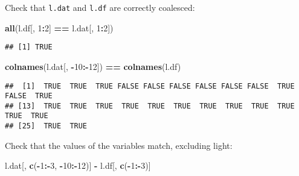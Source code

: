 \documentclass[]{article}
\newenvironment{Shaded}{\begin{snugshade}}{\end{snugshade}}
\newcommand{\KeywordTok}[1]{\textcolor[rgb]{0.13,0.29,0.53}{\textbf{#1}}}
\newcommand{\DecValTok}[1]{\textcolor[rgb]{0.00,0.00,0.81}{#1}}
\newcommand{\StringTok}[1]{\textcolor[rgb]{0.31,0.60,0.02}{#1}}
\newcommand{\OperatorTok}[1]{\textcolor[rgb]{0.81,0.36,0.00}{\textbf{#1}}}
\newcommand{\NormalTok}[1]{#1}
\begin{document}
Check that \texttt{l.dat} and \texttt{l.df} are correctly coalesced:

\begin{Shaded}
\begin{Highlighting}[]
\KeywordTok{all}\NormalTok{(l.df[, }\DecValTok{1}\OperatorTok{:}\DecValTok{2}\NormalTok{] }\OperatorTok{==}\StringTok{ }\NormalTok{l.dat[, }\DecValTok{1}\OperatorTok{:}\DecValTok{2}\NormalTok{])}
\end{Highlighting}
\end{Shaded}

\begin{verbatim}
## [1] TRUE
\end{verbatim}

\begin{Shaded}
\begin{Highlighting}[]
\KeywordTok{colnames}\NormalTok{(l.dat[, }\OperatorTok{-}\DecValTok{10}\OperatorTok{:-}\DecValTok{12}\NormalTok{]) }\OperatorTok{==}\StringTok{ }\KeywordTok{colnames}\NormalTok{(l.df)}
\end{Highlighting}
\end{Shaded}

\begin{verbatim}
##  [1]  TRUE  TRUE  TRUE FALSE FALSE FALSE FALSE FALSE FALSE  TRUE FALSE  TRUE
## [13]  TRUE  TRUE  TRUE  TRUE  TRUE  TRUE  TRUE  TRUE  TRUE  TRUE  TRUE  TRUE
## [25]  TRUE  TRUE
\end{verbatim}

Check that the values of the variables match, excluding light:

\begin{Shaded}
\begin{Highlighting}[]
\NormalTok{l.dat[, }\KeywordTok{c}\NormalTok{(}\OperatorTok{-}\DecValTok{1}\OperatorTok{:-}\DecValTok{3}\NormalTok{, }\OperatorTok{-}\DecValTok{10}\OperatorTok{:-}\DecValTok{12}\NormalTok{)] }\OperatorTok{-}\StringTok{ }\NormalTok{l.df[, }\KeywordTok{c}\NormalTok{(}\OperatorTok{-}\DecValTok{1}\OperatorTok{:-}\DecValTok{3}\NormalTok{)]}
\end{Highlighting}
\end{Shaded}
\end{document}
